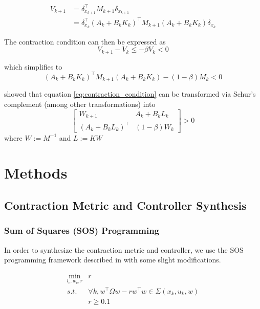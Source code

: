 \documentclass[conference]{IEEEtran}
\begin{document}
\begin{equation}
	\begin{aligned}
	V_{k+1} & = \delta^\top_{x_{k+1}} M_{k+1} \delta_{x_{k+1}} \\
	& = \delta^\top_{x_k} (A_k + B_k K_k)^\top M_{k+1} (A_k + B_k K_k)\delta_{x_k}
	\end{aligned}
\end{equation}

The contraction condition can then be expressed as
\begin{equation}
	V_{k+1} - V_k \leq 
	- \beta V_k <
	0
\end{equation}

which simplifies to
\begin{equation}
	\label{eq:contraction_condition}
	(A_k + B_k K_k)^\top M_{k+1} (A_k + B_k K_k) - (1 - \beta) M_k < 0
\end{equation}

\autocite{weiControlContractionMetric2021} showed that equation \ref{eq:contraction_condition} can be transformed via Schur's complement (among other transformations) into
\begin{equation}
	\label{eq:contraction_condition_schur}
	\begin{bmatrix}
		W_{k+1} & A_k + B_k L_k \\
		(A_k + B_k L_k)^\top & (1 - \beta) W_k
	\end{bmatrix} > 0
\end{equation}
where $W := M^{-1}$ and $L := KW$

\section{Methods}
\subsection{Contraction Metric and Controller Synthesis}
\subsubsection{Sum of Squares (SOS) Programming}
In order to synthesize the contraction metric and controller, we use the SOS programming framework described in \autocite{weiControlContractionMetric2021} with some slight modifications.

\begin{equation}
	\begin{aligned}
	\min_{l_c, w_c, r} & r \\
	s.t. & \forall k, w^\top \Omega w - r w^\top w \in \Sigma(x_k, u_k, w) \\
	& r \geq 0.1
	\end{aligned}
\end{equation}
\end{document}
